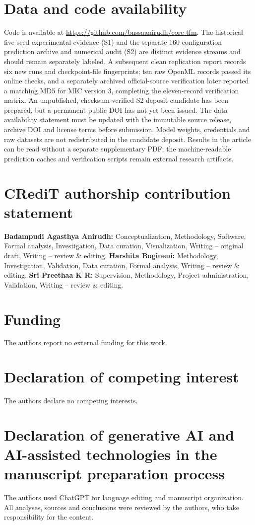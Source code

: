 \documentclass[a4paper,fleqn]{cas-sc}
\begin{document}
\section*{Data and code availability}
Code is available at \url{https://github.com/bnssaanirudh/core-tfm}. The historical five-seed experimental evidence (S1) and the separate 160-configuration prediction archive and numerical audit (S2) are distinct evidence streams and should remain separately labeled. A subsequent clean replication report records six new runs and checkpoint-file fingerprints; ten raw OpenML records passed its online checks, and a separately archived official-source verification later reported a matching MD5 for MIC version 3, completing the eleven-record verification matrix. An unpublished, checksum-verified S2 deposit candidate has been prepared, but a permanent public DOI has not yet been issued. The data availability statement must be updated with the immutable source release, archive DOI and license terms before submission. Model weights, credentials and raw datasets are not redistributed in the candidate deposit. Results in the article can be read without a separate supplementary PDF; the machine-readable prediction caches and verification scripts remain external research artifacts.

\section*{CRediT authorship contribution statement}
\textbf{Badampudi Agasthya Anirudh:} Conceptualization, Methodology, Software, Formal analysis, Investigation, Data curation, Visualization, Writing -- original draft, Writing -- review \& editing. \textbf{Harshita Bogineni:} Methodology, Investigation, Validation, Data curation, Formal analysis, Writing -- review \& editing. \textbf{Sri Preethaa K R:} Supervision, Methodology, Project administration, Validation, Writing -- review \& editing.

\section*{Funding}
The authors report no external funding for this work.

\section*{Declaration of competing interest}
The authors declare no competing interests.

\section*{Declaration of generative AI and AI-assisted technologies in the manuscript preparation process}
The authors used ChatGPT for language editing and manuscript organization. All analyses, sources and conclusions were reviewed by the authors, who take responsibility for the content.


\clearpage


\end{document}
